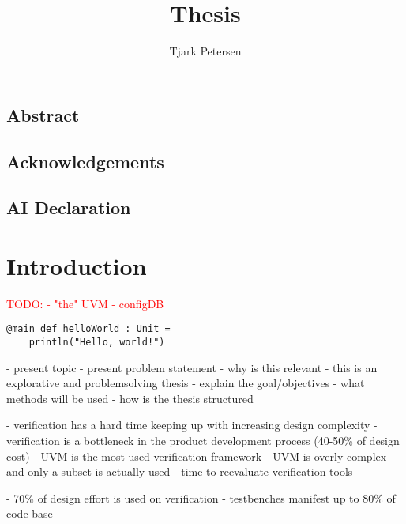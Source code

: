 \documentclass[11pt]{report}
\author{Tjark Petersen}
\title{Thesis}
\newcommand{\todo}[1]{\textcolor{red}{TODO: #1}}
\begin{document}
\maketitle

\section*{Abstract} %

\section*{Acknowledgements} %

\section*{AI Declaration} %

\newpage

\tableofcontents

\chapter{Introduction} %

\todo{
  - "the" UVM
  - configDB
}

\begin{lstlisting}
@main def helloWorld : Unit =
    println("Hello, world!")
\end{lstlisting}
- present topic
- present problem statement
- why is this relevant
- this is an explorative and problemsolving thesis
- explain the goal/objectives
- what methods will be used
- how is the thesis structured

- verification has a hard time keeping up with increasing design complexity
- verification is a bottleneck in the product development process (40-50\% of design cost) \cite{mehta2018asic}
- UVM is the most used verification framework
- UVM is overly complex and only a subset is actually used \cite{sutherland2015uvm}
- time to reevaluate verification tools

- 70\% of design effort is used on verification \cite[Ch. 1]{bergeron2012writing}
- testbenches manifest up to 80\% of code base \cite[Ch. 1]{bergeron2012writing}
\end{document}
